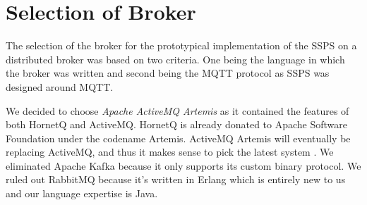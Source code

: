 \section{Selection of Broker}

The selection of the broker for the prototypical implementation of the SSPS on a distributed broker was based on two criteria. One being the language in which the broker was written and second being the MQTT protocol as SSPS was designed around MQTT.

We decided to choose \textit{Apache ActiveMQ Artemis} as it contained the features of both HornetQ and ActiveMQ. HornetQ is already donated to Apache Software Foundation under the codename Artemis. ActiveMQ Artemis will eventually be replacing ActiveMQ, and thus it makes sense to pick the latest system \parencite{artemis_vs_activemq}. We eliminated Apache Kafka because it only supports its custom binary protocol. We ruled out RabbitMQ because it's written in Erlang which is entirely new to us and our language expertise is Java.


